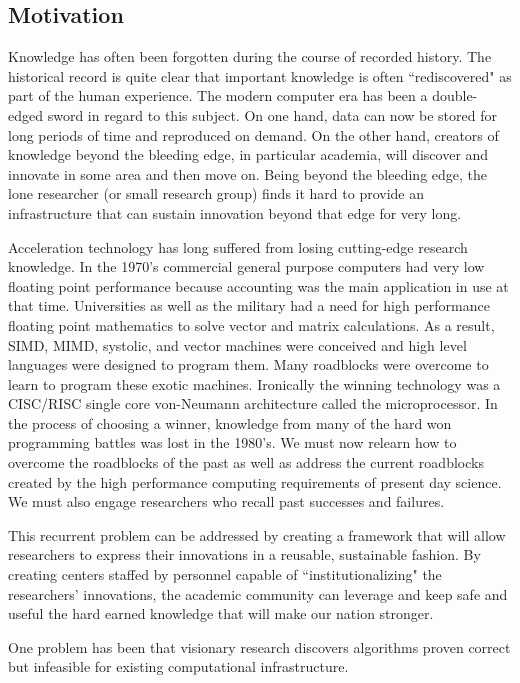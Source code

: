 \subsection{Motivation}
Knowledge has often been forgotten during the course of recorded history.
The historical record is quite clear that important knowledge is often ``rediscovered" as part of the human experience.
The modern computer era has been a double-edged sword in regard to this subject.
On one hand, data can now be stored for long periods of time and reproduced on demand. 
On the other hand, creators of knowledge beyond the bleeding edge, in particular academia,
will discover and innovate in some area and then move on. 
Being beyond the bleeding edge, the lone researcher (or small research group) finds it hard to provide an infrastructure that can sustain innovation beyond that edge for very long.

Acceleration technology has long suffered from losing cutting-edge research knowledge. 
In the 1970's commercial general purpose computers had very low floating point performance because accounting was the main application in use at that time. 
Universities as well as the military had a need for high performance floating point mathematics to solve vector and matrix calculations. 
As a result, SIMD, MIMD, systolic, and vector machines were conceived and high level languages were designed to program them. 
Many roadblocks were overcome to learn to program these exotic machines. 
Ironically the winning technology was a CISC/RISC single core von-Neumann architecture called the microprocessor. 
In the process of choosing a winner, knowledge from many of the hard won programming battles was lost in the 1980's. 
We must now relearn how to overcome the roadblocks of the past as well as address the current roadblocks created by the high performance computing requirements of present day science. 
We must also engage researchers who recall past successes and failures.

This recurrent problem can be addressed by creating a framework that will allow researchers to express their innovations in a reusable, sustainable fashion. 
By creating centers staffed by personnel capable of ``institutionalizing" the researchers' innovations, the academic community can leverage and keep safe and useful the hard earned knowledge that will make our nation stronger.

One problem has been that visionary research discovers algorithms proven correct but infeasible for existing computational infrastructure.
